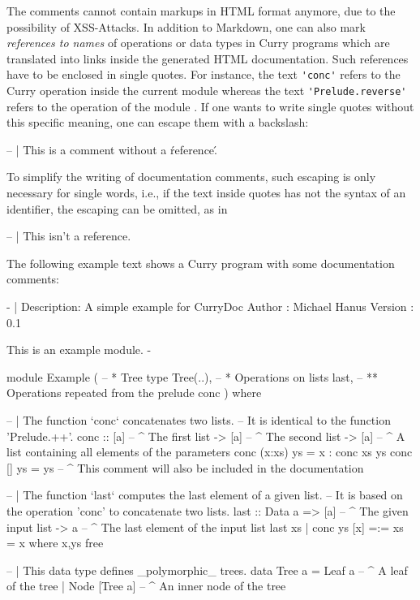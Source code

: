 The comments cannot contain markups in HTML format anymore,
due to the possibility of XSS-Attacks.
In addition to Markdown,
one can also mark \emph{references to names} of operations or data types
in Curry programs which are translated into links inside
the generated HTML documentation. Such references have to be
enclosed in single quotes. For instance, the text
\verb!'conc'! refers to the Curry operation 
inside the current module whereas the text
\verb!'Prelude.reverse'! refers to the operation 
of the module .
If one wants to write single quotes without this specific
meaning, one can escape them with a backslash:
\begin{curry}
-- | This is a comment without a \'reference\'.
\end{curry}
To simplify the writing of documentation comments,
such escaping is only necessary for single words,
i.e., if the text inside quotes has not the syntax of
an identifier, the escaping can be omitted, as in
\begin{curry}
-- | This isn't a reference.
\end{curry}
%
The following example text shows a Curry program with some
documentation comments:
\begin{curry}
{- |
     Description: A simple example for CurryDoc
     Author     : Michael Hanus
     Version    : 0.1

     This is an
     example module.
-}
module Example (
  -- * Tree type
  Tree(..),
  -- * Operations on lists
  last,
  -- ** Operations repeated from the prelude
  conc
 ) where

-- | The function `conc` concatenates two lists.
--   It is identical to the function 'Prelude.++'.
conc :: [a] -- ^ The first list
     -> [a] -- ^ The second list
     -> [a] -- ^ A list containing all elements of the parameters
conc (x:xs) ys = x : conc xs ys
conc []     ys = ys
-- ^ This comment will also be included in the documentation

-- | The function `last` computes the last element of a given list.
--   It is based on the operation 'conc' to concatenate two lists.
last :: Data a
     => [a] -- ^ The given input list
     -> a   -- ^ The last element of the input list
last xs | conc ys [x] =:= xs  = x   where x,ys free

-- | This data type defines _polymorphic_ trees.
data Tree a = Leaf a -- ^ A leaf of the tree
            | Node [Tree a] -- ^ An inner node of the tree
\end{curry}


